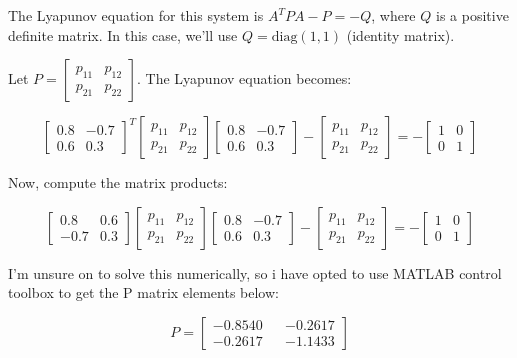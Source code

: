\documentclass{article}
\begin{document}
The Lyapunov equation for this system is \(A^T P A - P = -Q\), where \(Q\) is a positive definite matrix. In this case, we'll use \(Q = \text{diag}(1, 1)\) (identity matrix).

Let \(P = \begin{bmatrix} p_{11} & p_{12} \\ p_{21} & p_{22} \end{bmatrix}\). The Lyapunov equation becomes:

\[
\begin{bmatrix} 0.8 & -0.7 \\ 0.6 & 0.3 \end{bmatrix}^T \begin{bmatrix} p_{11} & p_{12} \\ p_{21} & p_{22} \end{bmatrix} \begin{bmatrix} 0.8 & -0.7 \\ 0.6 & 0.3 \end{bmatrix} - \begin{bmatrix} p_{11} & p_{12} \\ p_{21} & p_{22} \end{bmatrix} = - \begin{bmatrix} 1 & 0 \\ 0 & 1 \end{bmatrix}
\]

Now, compute the matrix products:

\[
\begin{bmatrix} 0.8 & 0.6 \\ -0.7 & 0.3 \end{bmatrix} \begin{bmatrix} p_{11} & p_{12} \\ p_{21} & p_{22} \end{bmatrix} \begin{bmatrix} 0.8 & -0.7 \\ 0.6 & 0.3 \end{bmatrix} - \begin{bmatrix} p_{11} & p_{12} \\ p_{21} & p_{22} \end{bmatrix} = - \begin{bmatrix} 1 & 0 \\ 0 & 1 \end{bmatrix}
\]

I'm unsure on to solve this numerically, so i have opted to use MATLAB control toolbox to get the P matrix elements below:

\[ P = \begin{bmatrix} 
-0.8540  &&  -0.2617 \\
   -0.2617  && -1.1433
\end{bmatrix} \]
\end{document}
